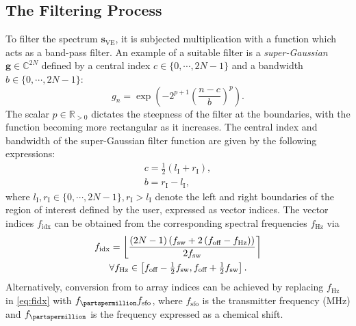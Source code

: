 \subsection{The Filtering Process}
To filter the spectrum $\symbf{s}_{\text{VE}}$, it is subjected multiplication
with a function which acts as a band-pass filter. An example of a suitable
filter is a \emph{super-Gaussian} $\symbf{g} \in \mathbb{C}^{2N}$ defined by a
central index  $c \in \lbrace 0, \cdots, 2N-1 \rbrace$ and a bandwidth $b \in
\lbrace 0, \cdots, 2N-1 \rbrace$:
\begin{equation}
    g_n = \exp \left(-2^{p+1} \left(\frac{n - c}{b}\right)^p\right).
    \label{eq:super-Gaussian-onedim}
\end{equation}
The scalar $p \in \mathbb{R}_{>0}$ dictates the steepness
of the filter at the boundaries, with the function becoming more rectangular
as it increases.
The central index and bandwidth of the super-Gaussian filter function are given
by the following expressions:
\begin{subequations}
    \begin{gather}
        c = \tfrac{1}{2} \left(l_{\text{I}} + r_{\text{I}}\right), \\
        b = r_{\text{I}} - l_{\text{I}},
    \end{gather}
\end{subequations}
where $l_{\text{I}}, r_{\text{I}} \in \lbrace 0, \cdots, 2N-1 \rbrace,
r_{\text{I}} > l_{\text{I}}$ denote the left and right
boundaries of the region of interest defined by the user, expressed as vector
indices.
The vector indices $f_{\text{idx}}$ can be obtained from the corresponding
spectral frequencies $f_{\unit{\hertz}}$ via
\begin{equation}
    \begin{gathered}
        f_{\text{idx}} =
            \left \lfloor
                \frac
                {
                    \left(2N - 1\right)
                    \left(\fsw + 2 \left(\foff - f_{\unit{\hertz}}\right) \right)
                }
                {2 \fsw}
            \right \rceil \\
        \forall f_{\unit{\hertz}} \in
            \left[\foff - \tfrac{1}{2} \fsw, \foff + \tfrac{1}{2} \fsw\right].
        \label{eq:fidx}
    \end{gathered}
\end{equation}
Alternatively, conversion from \unit{\partspermillion} to array indices can be
achieved by replacing  $f_{\unit{\hertz}}$ in \cref{eq:fidx} with
$f_{\unit{\partspermillion}} f_{\text{sfo}}$, where $f_{\text{sfo}}$ is the
transmitter frequency (\unit{\mega \hertz}) and $f_{\unit{\partspermillion}}$
is the frequency expressed as a chemical shift.


